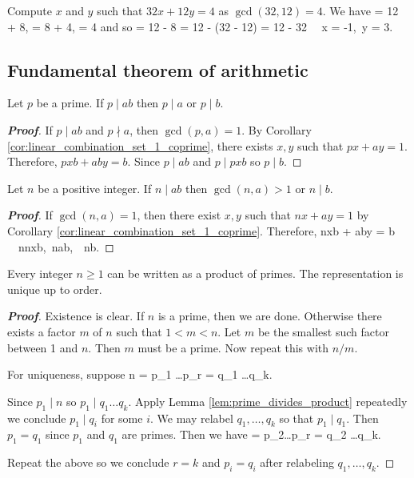 \begin{example}
Compute $x$ and $y$ such that $32x + 12y = 4$ as $\gcd(32,12) = 4$. We have
 = 12 + 8,  = 8 + 4, = 4
\ee
and so
 = 12 - 8 = 12 - (32 - 12) = 12 - 32 \ \ra\ x = -1,\ y = 3.
\ee
\end{example}

\subsection{Fundamental theorem of arithmetic}

\begin{lemma}\label{lem:prime_divides_product}
Let $p$ be a prime. If $p\mid ab$ then $p\mid a$ or $p\mid b$.
\end{lemma}

\begin{proof}[\bf Proof]
If $p\mid ab$ and $p\nmid a$, then $\gcd(p,a) = 1$. By Corollary \ref{cor:linear_combination_set_1_coprime}, there exists $x,y$ such that $px + ay =1$. Therefore, $pxb + aby = b$. Since $p\mid ab$ and $p\mid pxb$ so $p\mid b$.
\end{proof}

\begin{lemma}\label{lem:integer_divides_product}
Let $n$ be a positive integer. If $n\mid ab$ then $\gcd(n,a)>1$ or $n\mid b$.
\end{lemma}

\begin{proof}[\bf Proof]
If $\gcd(n,a) = 1$, then there exist $x,y$ such that $nx+ay = 1$ by Corollary \ref{cor:linear_combination_set_1_coprime}. Therefore,
\be
nxb + aby = b \ \ra\ n\mid nxb,\ n\mid ab,\ \ra\ n\mid b.
\ee
\end{proof}

\begin{theorem}\label{thm:fundamental_theorem_arithmetic}
Every integer $n\geq 1$ can be written as a product of primes. The representation is unique up to order.
\end{theorem}

\begin{proof}[\bf Proof]
Existence is clear. If $n$ is a prime, then we are done. Otherwise there exists a factor $m$ of $n$ such that $1<m<n$. Let $m$ be the smallest such factor between 1 and $n$. Then $m$ must be a prime. Now repeat this with $n/m$.

For uniqueness, suppose
\be
n = p_1 \dots p_r = q_1 \dots q_k.
\ee

Since $p_1\mid n$ so $p_1 \mid q_1\dots q_k$. Apply Lemma \ref{lem:prime_divides_product} repeatedly we conclude $p_1\mid q_i$ for some $i$. We may relabel $q_1,\dots,q_k$ so that $p_1\mid q_1$. Then $p_1 = q_1$ since $p_1$ and $q_1$ are primes. Then we have
\be
{} = p_2\dots p_r = q_2 \dots q_k.
\ee

Repeat the above so we conclude $r=k$ and $p_i = q_i$ after relabeling $q_1,\dots,q_k$.
\end{proof}

